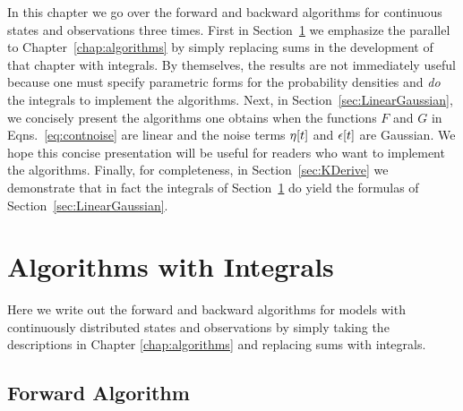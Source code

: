 In this chapter we go over the forward and backward algorithms for
continuous states and observations three times.  First in
Section~\ref{sec:integrals} we emphasize the parallel to
Chapter~\ref{chap:algorithms} by simply replacing sums in the
development of that chapter with integrals.  By themselves, the
results are not immediately useful because one must specify parametric
forms for the probability densities and \emph{do} the integrals to
implement the algorithms.  Next, in Section~\ref{sec:LinearGaussian},
we concisely present the algorithms one obtains when the functions $F$
and $G$ in Eqns.~\eqref{eq:contnoise} are linear and the noise terms
${\eta}{[t]}$ and ${\epsilon}{[t]}$ are Gaussian.  We hope this
concise presentation will be useful for readers who want to implement
the algorithms.  Finally, for completeness, in
Section~\ref{sec:KDerive} we demonstrate that in fact the integrals of
Section~\ref{sec:integrals} do yield the formulas of
Section~\ref{sec:LinearGaussian}.

\section{Algorithms with Integrals}
\label{sec:integrals}

Here we write out the forward and backward algorithms for models with
continuously distributed states and observations by simply taking the
descriptions in Chapter \ref{chap:algorithms} and replacing sums with
integrals.

\subsection{Forward Algorithm}

